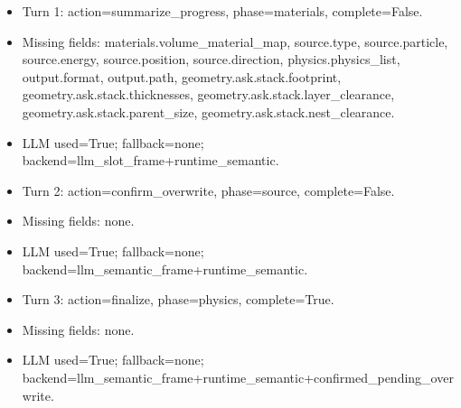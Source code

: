\documentclass[11pt]{ctexart}
\begin{document}
\begin{itemize}
\item Turn 1: action=summarize\_progress, phase=materials, complete=False.
\item Missing fields: materials.volume\_material\_map, source.type, source.particle, source.energy, source.position, source.direction, physics.physics\_list, output.format, output.path, geometry.ask.stack.footprint, geometry.ask.stack.thicknesses, geometry.ask.stack.layer\_clearance, geometry.ask.stack.parent\_size, geometry.ask.stack.nest\_clearance.
\item LLM used=True; fallback=none; backend=llm\_slot\_frame+runtime\_semantic.
\item Turn 2: action=confirm\_overwrite, phase=source, complete=False.
\item Missing fields: none.
\item LLM used=True; fallback=none; backend=llm\_semantic\_frame+runtime\_semantic.
\item Turn 3: action=finalize, phase=physics, complete=True.
\item Missing fields: none.
\item LLM used=True; fallback=none; backend=llm\_semantic\_frame+runtime\_semantic+confirmed\_pending\_overwrite.
\end{itemize}
\end{document}
